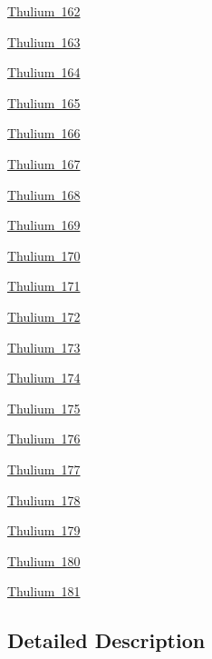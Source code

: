 \begin{DoxyCompactItemize}
\item 
\mbox{\hyperlink{group___isotope_const-_thulium-_tm162}{Thulium 162}}
\item 
\mbox{\hyperlink{group___isotope_const-_thulium-_tm163}{Thulium 163}}
\item 
\mbox{\hyperlink{group___isotope_const-_thulium-_tm164}{Thulium 164}}
\item 
\mbox{\hyperlink{group___isotope_const-_thulium-_tm165}{Thulium 165}}
\item 
\mbox{\hyperlink{group___isotope_const-_thulium-_tm166}{Thulium 166}}
\item 
\mbox{\hyperlink{group___isotope_const-_thulium-_tm167}{Thulium 167}}
\item 
\mbox{\hyperlink{group___isotope_const-_thulium-_tm168}{Thulium 168}}
\item 
\mbox{\hyperlink{group___isotope_const-_thulium-_tm169}{Thulium 169}}
\item 
\mbox{\hyperlink{group___isotope_const-_thulium-_tm170}{Thulium 170}}
\item 
\mbox{\hyperlink{group___isotope_const-_thulium-_tm171}{Thulium 171}}
\item 
\mbox{\hyperlink{group___isotope_const-_thulium-_tm172}{Thulium 172}}
\item 
\mbox{\hyperlink{group___isotope_const-_thulium-_tm173}{Thulium 173}}
\item 
\mbox{\hyperlink{group___isotope_const-_thulium-_tm174}{Thulium 174}}
\item 
\mbox{\hyperlink{group___isotope_const-_thulium-_tm175}{Thulium 175}}
\item 
\mbox{\hyperlink{group___isotope_const-_thulium-_tm176}{Thulium 176}}
\item 
\mbox{\hyperlink{group___isotope_const-_thulium-_tm177}{Thulium 177}}
\item 
\mbox{\hyperlink{group___isotope_const-_thulium-_tm178}{Thulium 178}}
\item 
\mbox{\hyperlink{group___isotope_const-_thulium-_tm179}{Thulium 179}}
\item 
\mbox{\hyperlink{group___isotope_const-_thulium-_tm180}{Thulium 180}}
\item 
\mbox{\hyperlink{group___isotope_const-_thulium-_tm181}{Thulium 181}}
\end{DoxyCompactItemize}


\subsection{Detailed Description}
